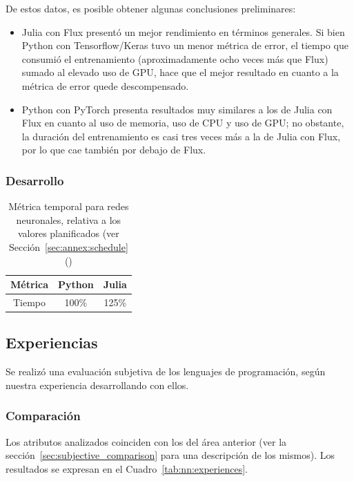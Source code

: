 \documentclass[11pt]{article}
\let\Oldsubsection\subsection
\renewcommand{\subsection}{\FloatBarrier\Oldsubsection}
\let\Oldsubsubsection\subsubsection
\renewcommand{\subsubsection}{\FloatBarrier\Oldsubsubsection}
\begin{document}
De estos datos, es posible obtener algunas conclusiones preliminares:

\begin{itemize}
    \item Julia con Flux presentó un mejor rendimiento en términos generales. Si bien Python con Tensorflow/Keras tuvo un menor métrica de error, el tiempo que consumió el entrenamiento (aproximadamente ocho veces más que Flux) sumado al elevado uso de GPU, hace que el mejor resultado en cuanto a la métrica de error quede descompensado.
    \item Python con PyTorch presenta resultados muy similares a los de Julia con Flux en cuanto al uso de memoria, uso de CPU y uso de GPU; no obstante, la duración del entrenamiento es casi tres veces más a la de Julia con Flux, por lo que cae también por debajo de Flux.
\end{itemize}



\subsubsection{Desarrollo}

\begin{table}[H]
\centering
\begin{tabular}{|c|c|c|}
\hline
Métrica & Python & Julia \\ \hline
Tiempo & 100\% & 125\% \\ \hline
\end{tabular}
\caption{Métrica temporal para redes neuronales, relativa a los valores planificados (ver Sección~\ref{sec:annex:schedule} ()}
\end{table}

\subsection{Experiencias}

Se realizó una evaluación subjetiva de los lenguajes de programación, según nuestra experiencia desarrollando con ellos.

\subsubsection{Comparación}

Los atributos analizados coinciden con los del área anterior (ver la sección~\ref{sec:subjective_comparison} para una descripción de los mismos).
Los resultados se expresan en el Cuadro~\ref{tab:nn:experiences}.
\end{document}
